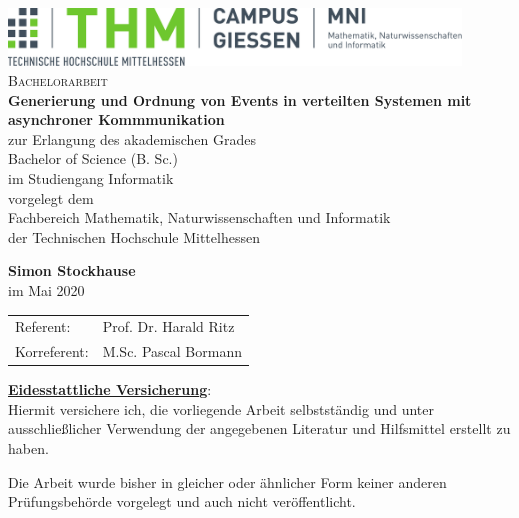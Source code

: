 \documentclass[%
	BCOR=8.25mm,         %
	DIV=12,              %
	parskip=half,				 %
	bibliography=totoc,	 %
	headsepline=on,      %
	openany,
	ngerman
	]{scrbook}
\begin{document}
\frontmatter

\begin{titlepage}
	\begin{center}
	\includegraphics[width=0.9\textwidth]{img/mni-logo}\\[5cm]
	\textsc{\Large Bachelorarbeit}\\[2cm]
	\textbf{\huge\sffamily Generierung und Ordnung von Events in verteilten Systemen mit asynchroner Kommmunikation}\\[2cm]
	
	zur Erlangung des akademischen Grades \\
	Bachelor of Science (B. Sc.) \\
	\vspace{10px}
	im Studiengang Informatik\\
	\vspace{10px}
	vorgelegt dem\\
	Fachbereich Mathematik, Naturwissenschaften und Informatik\\ der Technischen Hochschule Mittelhessen
	
	\textbf{Simon Stockhause}\\ [1.5cm] 
	im Mai 2020
	\end{center}
	\center
	\begin{tabular}{ll}
		Referent: & Prof. Dr. Harald Ritz\\ 
		Korreferent: & M.Sc. Pascal Bormann\\ 
	\end{tabular}
\end{titlepage}
\cleardoubleemptypage

\pagestyle{empty}
{
	\renewcommand{\thispagestyle}[1]{}
	\underline{\textbf{Eidesstattliche Versicherung}}:\\
	Hiermit versichere ich, die vorliegende Arbeit selbstständig und unter
	ausschließlicher Verwendung der angegebenen Literatur und Hilfsmittel erstellt zu
	haben.
	
	Die Arbeit wurde bisher in gleicher oder ähnlicher Form keiner anderen
	Prüfungsbehörde vorgelegt und auch nicht veröffentlicht.
	
}
\clearpage
\pagestyle{plain}
\end{document}
